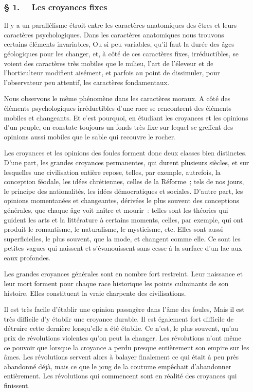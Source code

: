 \documentclass[french,twoside]{book} %
\begin{document}
\subsubsection[{§ 1. – Les croyances fixes}]{§ 1. – Les croyances fixes}
\noindent Il y a un parallélisme étroit entre les caractères anatomiques des êtres et leurs caractères psychologiques. Dans les caractères anatomiques nous trouvons certains éléments invariables, Ou si peu variables, qu’il faut la durée des âges géologiques pour les changer, et, à côté de ces caractères fixes, irréductibles, se voient des carac­tères très mobiles que le milieu, l’art de l’éleveur et de l’horticulteur modifient aisément, et parfois au point de dissimuler, pour l’observateur peu attentif, les carac­tères fondamentaux.\par
Nous observons le même phénomène dans les caractères moraux. A côté des éléments psychologiques irréductibles d’une race se rencontrent des éléments mobiles et changeants. Et c’est pourquoi, en étudiant les croyances et les opinions d’un peuple, on constate toujours un fonds très fixe sur lequel se greffent des opinions aussi mobiles que le sable qui recouvre le rocher.\par
Les croyances et les opinions des foules forment donc deux classes bien distinc­tes. D’une part, les grandes croyances permanentes, qui durent plusieurs siècles, et sur lesquelles une civilisation entière repose, telles, par exemple, autrefois, la conception féodale, les idées chrétiennes, celles de la Réforme ; tels de nos jours, le principe des nationalités, les idées démocratiques et sociales. D’autre part, les opinions momenta­nées et changeantes, dérivées le plus souvent des conceptions générales, que chaque âge voit naître et mourir : telles sont les théories qui guident les arts et la littérature à certains moments, celles, par exemple, qui ont produit le romantisme, le naturalisme, le mysticisme, etc. Elles sont aussi superficielles, le plus souvent, que la mode, et changent comme elle. Ce sont les petites vagues qui naissent et s’évanouissent sans cesse à la surface d’un lac aux eaux profondes.\par
Les grandes croyances générales sont en nombre fort restreint. Leur naissance et leur mort forment pour chaque race historique les points culminants de son histoire. Elles constituent la vraie charpente des civilisations.\par
Il est très facile d’établir une opinion passagère dans l’âme des foules, Mais il est très difficile d’y établir une croyance durable. Il est également fort difficile de détruire cette dernière lorsqu’elle a été établie. Ce n’est, le plus souvent, qu’au prix de révo­lutions violentes qu’on peut la changer. Les révolutions n’ont même ce pouvoir que lorsque la croyance a perdu presque entièrement son empire sur les âmes. Les révolutions servent alors à balayer finalement ce qui était à peu près abandonné déjà, mais ce que le joug de la coutume empêchait d’abandonner entièrement. Les révo­lutions qui commencent sont en réalité des croyances qui finissent.\par
\end{document}
